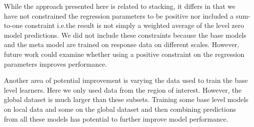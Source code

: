 \documentclass[11pt]{article}
\begin{document}

While the approach presented here is related to stacking, it differs in that we have not constrained the regression parameters to be positive nor included a sum-to-one constraint i.e.\thinspace the result is not simply a weighted average of the level zero model predictions.
We did not include these constraints because the base models and the meta model are trained on response data on different scales.
However, future work could examine whether using a positive constraint on the regression parameters improves performance.

Another area of potential improvement is varying the data used to train the base level learners.
Here we only used data from the region of interest.
However, the global dataset is much larger than these subsets.
Training some base level models on local data and some on the global dataset and then combining predictions from all these models has potential to further improve model performance.


 

\end{document}
